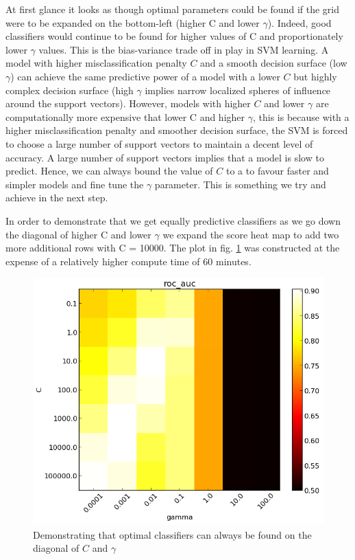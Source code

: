 \documentclass[final,3p,times,twocolumn]{elsarticle}
\begin{document}
At first glance it looks as though optimal parameters could be found if the grid were to be expanded on the bottom-left (higher C and lower $\gamma$). Indeed, good classifiers would continue to be found for higher values of C and proportionately lower $\gamma$ values. This is the bias-variance trade off in play in  SVM learning. A model with higher misclassification penalty $C$ and a smooth decision surface (low $\gamma$) can achieve the same predictive power of a model with a lower $C$ but highly complex decision surface (high $\gamma$ implies narrow localized spheres of influence around the support vectors). However, models with higher $C$ and lower $\gamma$ are computationally  more expensive that lower C and higher $\gamma$, this is because with a higher misclassification penalty and smoother decision surface, the SVM is forced to choose a large number of support vectors to maintain a decent level of accuracy. A large number of support vectors implies that a model is slow to predict. Hence, we can always bound the value of $C$ to a to favour faster and simpler models and fine tune the $\gamma$ parameter. This is something we try and achieve in the next step.

In order to demonstrate that we get equally predictive classifiers as we go down the diagonal of higher C and lower $\gamma$ we expand the score heat map to add two more additional rows with C = 10000. The plot in fig. \ref{rochigh} was constructed at the expense of a relatively higher compute time of $60$ minutes. 

\begin{figure}
\includegraphics[scale=0.5]{Images/ROC_AUC_high.png}
\caption{Demonstrating that optimal classifiers can always be found on the diagonal of $C$ and $\gamma$}
\label{rochigh}
\end{figure}
\end{document}
